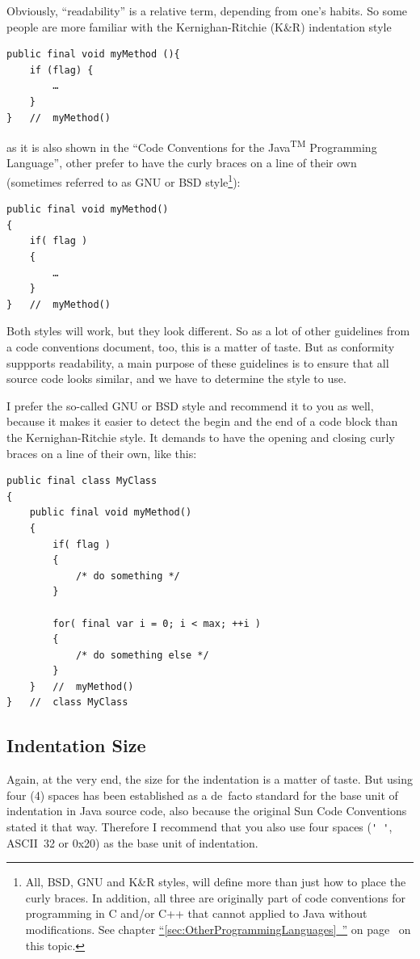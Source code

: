 \documentclass[11pt,a4paper, titlepage, parskip=half, headsepline, footsepline, cleardoublepage=current, headheight=1cm]{scrbook}
\newcommand*{\tqfullvref}[1]{\hyperref[{#1}]{“\ref*{#1}~\nameref*{#1}”} on page~\pageref{#1}}
\begin{document}
Obviously, “readability” is a relative term, depending from one's habits. So some people are more familiar with the Kernighan-Ritchie (K\&R) indentation style

\begin{lstlisting}
public final void myMethod (){
    if (flag) {
        …
    }
}   //  myMethod()
\end{lstlisting}

as it is also shown in the “Code Conventions for the Java\textsuperscript{TM} Programming Language”\autocite{SUN_CODE_CONVENTIONS}, other prefer to have the curly braces on a line of their own (sometimes referred to as GNU or BSD style\footnote{All, BSD, GNU and K\&R styles, will define more than just how to place the curly braces. In addition, all three are originally part of code conventions for programming in C and/or C++ that cannot applied to Java without modifications. See chapter \tqfullvref{sec:OtherProgrammingLanguages} on this topic.}):

\begin{lstlisting}
public final void myMethod()
{
    if( flag )
    {
    	…
    }
}   //  myMethod()
\end{lstlisting}

Both styles will work, but they look different. So as a lot of other guidelines from a code conventions document, too, this is a matter of taste. But as conformity suppports readability, a main purpose of these guidelines is to ensure that all source code looks similar, and we have to determine the style to use.

I prefer the so-called GNU or BSD style and recommend it to you as well, because it makes it easier to detect the begin and the end of a code block than the Kernighan-Ritchie style. It demands to have the opening and closing curly braces on a line of their own, like this:

\begin{lstlisting}
public final class MyClass
{
    public final void myMethod()
    {
        if( flag )
        {
            /* do something */
        }
        
        for( final var i = 0; i < max; ++i )
        {
            /* do something else */
        } 
    }   //  myMethod()
}   //  class MyClass
\end{lstlisting}

\subsection{Indentation Size}\label{sec:IndentationSize}
Again, at the very end, the size for the indentation is a matter of taste. But using four (4) spaces has been established as a de~facto standard for the base unit of indentation in Java source code, also because the original Sun Code Conventions\autocite{SUN_CODE_CONVENTIONS:Indentation} stated it that way. Therefore I recommend that you also use four spaces (\lstinline|' '|, ASCII~32 or 0x20) as the base unit of indentation.
\end{document}
